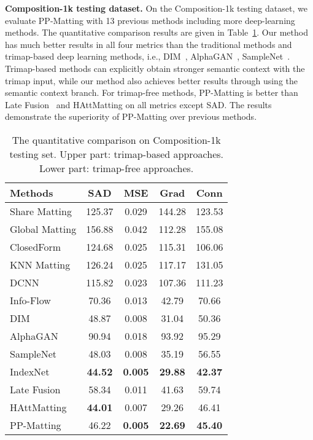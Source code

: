 \documentclass[10pt,twocolumn,letterpaper]{article}
\begin{document}
\textbf{Composition-1k testing dataset.} On the Composition-1k testing dataset, we evaluate PP-Matting with 13 previous methods including more deep-learning methods. The quantitative comparison results are given in Table~\ref{tab:composition}. Our method has much better results in all four metrics than the traditional methods and trimap-based deep learning methods, i.e., DIM~\cite{xu2017deep}, AlphaGAN~\cite{lutz2018alphagan}, SampleNet~\cite{tang2019learning}. Trimap-based methods can explicitly obtain stronger semantic context with the trimap input, while our method also achieves better results through using the semantic context branch. For trimap-free methods, PP-Matting is better than Late Fusion~\cite{zhang2019late} and HAttMatting on all metrics except SAD. The results demonstrate the superiority of PP-Matting over previous methods.

\begin{table}
  \centering
  \begin{tabular}{@{}lcccc@{}}
    \toprule
    Methods & SAD & MSE & Grad & Conn \\
    \midrule
    Share Matting \cite{gastal2010shared} & 125.37 & 0.029 & 144.28 & 123.53 \\
    Global Matting\cite{he2011global} & 156.88 & 0.042 & 112.28 & 155.08 \\
    ClosedForm \cite{levin2007closed} & 124.68 & 0.025 & 115.31 & 106.06 \\
    KNN Matting \cite{chen2013knn} & 126.24 & 0.025 & 117.17 & 131.05 \\
    DCNN \cite{shen2016deep} & 115.82 & 0.023 & 107.36 & 111.23 \\
    Info-Flow \cite{aksoy2017designing} & 70.36 & 0.013 & 42.79 & 70.66 \\
    DIM \cite{xu2017deep} & 48.87 & 0.008 & 31.04 & 50.36 \\
    AlphaGAN \cite{lutz2018alphagan} & 90.94 & 0.018 & 93.92& 95.29 \\
    SampleNet \cite{tang2019learning} & 48.03 & 0.008 & 35.19 & 56.55 \\
    IndexNet \cite{lu2019indices} & \bf{44.52} & \bf{0.005} & \bf{29.88} & \bf{42.37} \\
    \midrule
    Late Fusion \cite{zhang2019late} & 58.34 & 0.011 & 41.63 & 59.74 \\
    HAttMatting \cite{qiao2020attention} & \bf{44.01} & 0.007 & 29.26 & 46.41 \\
PP-Matting & 46.22 & \bf{0.005} & \bf{22.69} & \bf{45.40} \\
    \bottomrule
  \end{tabular}
  \caption{The quantitative comparison on Composition-1k testing set. Upper part: trimap-based approaches. Lower part: trimap-free approaches.}
  \label{tab:composition}
\end{table}
\end{document}
